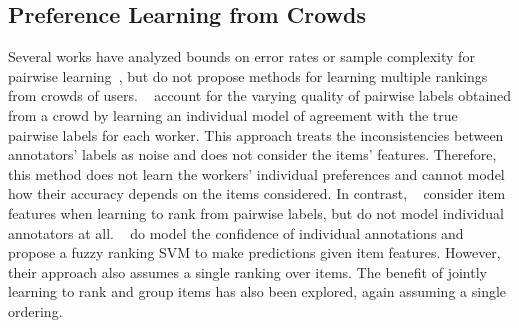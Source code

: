 \subsection{Preference Learning from Crowds}

Several works have analyzed bounds on error rates or sample complexity for pairwise 
learning~\citep{chen2015spectral,shah2015estimation}, but do not propose methods
for learning multiple rankings from crowds of users.
~\citet{chen2013pairwise} account for the varying quality of pairwise labels obtained from a crowd
by learning an individual model of agreement with the true pairwise labels for each worker.  
This approach treats the inconsistencies between annotators' labels as noise and does not consider the
items' features. Therefore, this method does not learn the workers' individual preferences
and cannot model how their accuracy depends on the items considered. 
In contrast, ~\citet{fu2016robust} consider item features when learning to rank from pairwise labels, 
but do not model individual annotators at all.
~\citet{uchida2017entity} do model the confidence of individual annotations
and propose a fuzzy ranking SVM to make predictions given item features. 
However, their approach also assumes a single ranking over items.
The benefit of jointly learning to rank and group items has also been explored\citep{li2018simultaneous}, again assuming a single ordering.

